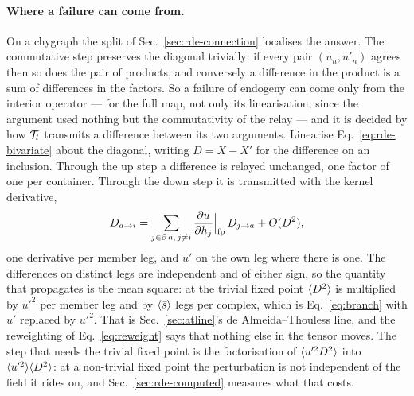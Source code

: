 \paragraph{Where a failure can come from.} On a chygraph the split of
Sec.~\ref{sec:rde-connection} localises the answer. The commutative step
preserves the diagonal trivially: if every pair $(u_{n},u'_{n})$ agrees then
so does the pair of products, and conversely a difference in the product is
a sum of differences in the factors. So a failure of endogeny can come only
from the interior operator --- for the full map, not only its
linearisation, since the argument used nothing but the commutativity of the
relay --- and it is decided by how $\mathcal{T}_{l}$ transmits a difference
between its two arguments. Linearise Eq.~\eqref{eq:rde-bivariate}
about the diagonal, writing $D=X-X'$ for the difference on an inclusion.
Through the up step a difference is relayed unchanged, one factor of one
per container. Through the down step it is transmitted with the kernel
derivative,
\begin{equation}
  D_{a\to i}=\sum_{j\in\operatorname{\partial} a,\,j\ne i}
    \frac{\partial u}{\partial h_{j}}\Big|_{\mathrm{fp}}\,D_{j\to a}
  +O(D^{2}),
  \label{eq:rde-diff}
\end{equation}
one derivative per member leg, and $\hat u'$ on the own leg where there is
one. The differences on distinct legs are independent and of either sign,
so the quantity that propagates is the mean square: at the trivial fixed
point $\langle D^{2} \rangle$ is multiplied by $u'^{2}$ per member leg and by
$\langle \bar s \rangle$ legs per complex, which is Eq.~\eqref{eq:branch} with $u'$
replaced by $u'^{2}$. That is Sec.~\ref{sec:atline}'s de Almeida--Thouless
line, and the reweighting of Eq.~\eqref{eq:reweight} says that nothing else
in the tensor moves. The step that needs the trivial fixed point is the
factorisation of $\langle u'^{2}D^{2} \rangle$ into $\langle u'^{2} \rangle\langle D^{2} \rangle$: at a
non-trivial fixed point the perturbation is not independent of the field
it rides on, and Sec.~\ref{sec:rde-computed} measures what that costs.

